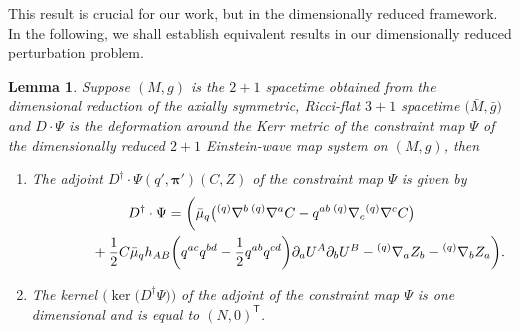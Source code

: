 \documentclass[pdftex]{sigma}
\def\ptl{\partial}%
\def\mbo#1{\boldsymbol{#1}}%
\def\grad{{\nabla}}%
\newcommand{\leftexp}[2]{{\vphantom{#2}}^{#1}{#2}}
\def\halb{\frac{1}{2}}%
\numberwithin{equation}{section}
\newtheorem{Lemma}[Theorem]{Lemma}
\begin{document}
 This result is crucial for our work, but in the dimensionally reduced framework. In the following, we shall establish equivalent results in our dimensionally reduced perturbation problem.
\begin{Lemma}
Suppose $(M, g)$ is the $2+1$ spacetime obtained from the dimensional reduction of the axially symmetric, Ricci-flat $3+1$ spacetime $\bigl(\bar{M}, \bar{g}\bigr)$ and $D \cdot \Psi$ is the deformation around the Kerr metric of the constraint map $\Psi$ of the dimensionally reduced $2+1$ Einstein-wave map system on $(M, g)$, then
\begin{enumerate}\itemsep=0pt
\item[$(1)$] The adjoint $D^\dagger \cdot \Psi (q', \mbo{\pi}') (C, Z) $ of the constraint map $\Psi$ is given by
\begin{gather}
D^{\dagger} \cdot \Psi = \biggl(\bar{\mu}_q \bigl(\leftexp{(q)}{\grad}^b \,\leftexp{(q)}{\grad}^a C -q^{ab}\, \leftexp{(q)}{\grad}_c \leftexp{(q)}{\grad}^c C\bigr)\nonumber\\
\hphantom{D^{\dagger} \cdot \Psi =}{}
+ \halb C \bar{\mu}_q h_{AB} \biggl(q^{ac}q^{bd} - \halb q^{ab} q^{cd}\biggr)\ptl_a U^A \ptl_b U^B
 - \leftexp{(q)}{\grad}_a Z_b - \leftexp{(q)}{\grad}_b Z_a \biggr).\label{2+1adjoint}
\end{gather}

\item[$(2)$] The kernel $\bigl(\operatorname{ker} \bigl(D^\dagger \Psi\bigr)\bigr)$ of the adjoint of the constraint map $\Psi$ is one dimensional and is equal to
$(N, 0)^{\mathsf{T}}$.
\end{enumerate}
\end{Lemma}
\end{document}
